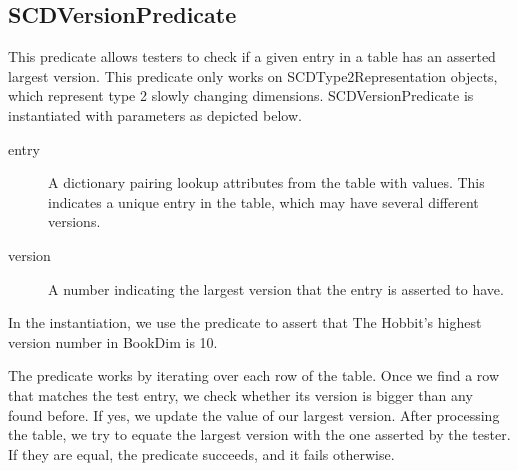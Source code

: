 \subsection{SCDVersionPredicate}\label{SCD}

This predicate allows testers to check if a given entry in a table has an asserted largest version. This predicate only works on SCDType2Representation objects, which represent type 2 slowly changing dimensions. SCDVersionPredicate is instantiated with parameters as depicted below.


\begin{description}
\item [entry] A dictionary pairing lookup attributes from the table with values. This indicates a unique entry in the table, which may have several different versions. 
\item [version] A number indicating the largest version that the entry is asserted to have.
\end{description}

In the instantiation, we use the predicate to assert that The Hobbit's highest version number in BookDim is 10.

The predicate works by iterating over each row of the table. Once we find a row that matches the test entry, we check whether its version is bigger than any found before. If yes, we update the value of our largest version. After processing the table, we try to equate the largest version with the one asserted by the tester. If they are equal, the predicate succeeds, and it fails otherwise.   
